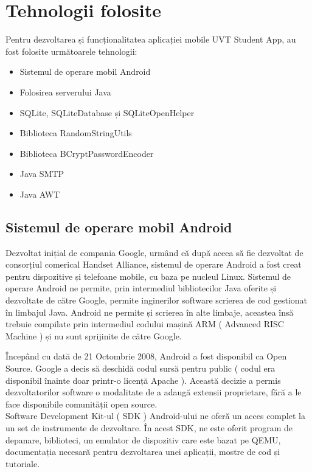 \documentclass{article}
\begin{document}
	\newpage

	\section{Tehnologii folosite}
	\vspace{1cm}
		 Pentru dezvoltarea și funcționalitatea aplicației mobile UVT Student App, au fost folosite următoarele tehnologii:
	\begin{itemize}
		\item Sistemul de operare mobil Android
		\item Folosirea serverului Java
		\item SQLite, SQLiteDatabase și SQLiteOpenHelper
		\item Biblioteca RandomStringUtils
		\item Biblioteca BCryptPasswordEncoder
		\item Java SMTP
		\item Java AWT

	\end{itemize}
		\subsection{Sistemul de operare mobil Android} 
		\vspace{0.3cm}
	 Dezvoltat inițial de compania Google, urmând că după aceea să fie dezvoltat de consorțiul comerical Handset Alliance, sistemul de operare Android a fost creat pentru dispozitive și telefoane mobile, cu baza pe nucleul Linux. Sistemul de operare Android ne permite, prin intermediul bibliotecilor Java oferite și dezvoltate de către Google, permite inginerilor software scrierea de cod gestionat în limbajul Java. Android ne permite și scrierea în alte limbaje, aceastea însă trebuie compilate prin intermediul codului mașină ARM ( Advanced RISC Machine ) și nu sunt sprijinite de către Google.

	Începând cu dată de 21 Octombrie 2008, Android a fost disponibil ca Open Source. Google a decis să deschidă codul sursă pentru public ( codul era disponibil înainte doar printr-o licență Apache ). Această decizie a permis dezvoltatorilor software o modalitate de a adaugă extensii proprietare, fără a le face disponibile comunității open source. \\

	Software Development Kit-ul ( SDK ) Android-ului ne oferă un acces complet la un set de instrumente de dezvoltare. În acest SDK, ne este oferit program de depanare, biblioteci, un emulator de dispozitiv care este bazat pe QEMU, documentația necesară pentru dezvoltarea unei aplicații, mostre de cod și tutoriale. \\
\end{document}
